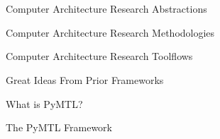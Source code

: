 
\section[{\it Presentation} PyMTL Intro]{}

\begin{frame}{Computer Architecture Research Abstractions}
\end{frame}

\begin{frame}{Computer Architecture Research Methodologies}
\end{frame}

\begin{frame}{Computer Architecture Research Toolflows}
\end{frame}

\begin{frame}{Great Ideas From Prior Frameworks}
\end{frame}

\begin{frame}{What is PyMTL?}
\end{frame}

\begin{frame}{The PyMTL Framework}
\end{frame}

